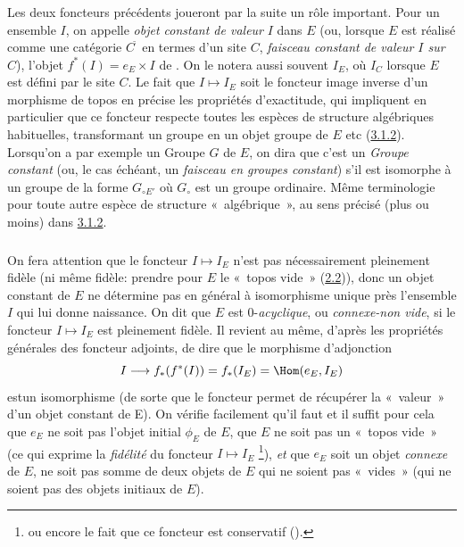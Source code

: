 \documentclass[10pt]{../fichiers-configuration-latex/smfart}
\begin{document}
\setcounter{subsubsection}{3}
\subsubsection{}
Les deux foncteurs précédents joueront par la suite un rôle
important. Pour un ensemble $I$, on appelle \emph{objet constant de
valeur} $I$ dans $E$ (ou, lorsque $E$ est réalisé comme une
catégorie $C^{\widetilde{\phantom{,}}}$ en termes d'un site $C$,
\emph{faisceau constant de valeur $I$ sur $C$}), l'objet
$f^{\ast}(I)=e_E\times I$ de . On le notera aussi
souvent $I_E$, où $I_C$ lorsque $E$ est défini par le site $C$.
Le fait que $I\mapsto I_E$ soit le foncteur image inverse d'un
morphisme de topos en précise les propriétés d'exactitude, qui
impliquent en particulier que ce foncteur respecte toutes les
espèces de structure algébriques habituelles, transformant un
groupe en un objet groupe de $E$ etc (\hyperref[IV.subsubsec3.1.2]{3.1.2}).
Lorsqu'on a par exemple un Groupe $G$ de $E$, on dira que c'est un
\emph{Groupe constant} (ou, le cas échéant, un \emph{faisceau en
groupes constant}) s'il est isomorphe à un groupe de la forme
$G_{\circ E'}$ où $G_{\circ}$ est un groupe ordinaire. Même
terminologie pour toute autre espèce de structure
« algébrique », au sens précisé (plus ou moins) dans
\hyperref[IV.subsubsec3.1.2]{3.1.2}.

\subsubsection{}
On fera attention que le foncteur $I\mapsto I_E$ n'est pas
nécessairement pleinement fidèle (ni même fidèle: prendre
pour $E$ le « topos vide »  (\hyperref[IV.subsec2.2]{2.2})), donc un objet
constant de $E$ ne détermine pas en général à isomorphisme
unique près l'ensemble $I$ qui lui donne naissance. On dit que $E$
est $0$-\emph{acyclique}, ou \emph{connexe-non vide}, si le foncteur
$I\mapsto I_E$ est pleinement fidèle. Il revient au même,
d'après les propriétés générales des foncteur adjoints, de
dire que le morphisme d'adjonction
$$
I\longrightarrow f_{\ast}(f^{\ast}(I))=f_{\ast}(I_E)=\Hom(e_E, I_E)
$$
est\pageoriginale un isomorphisme (de sorte que le foncteur
 permet de récupérer la « valeur »  d'un objet
constant de E). On vérifie facilement qu'il faut et il suffit pour
cela que $e_E$ ne soit pas l'objet initial $\phi_E$ de $E$, \ie que
$E$ ne soit pas un « topos vide » (ce qui exprime la
\emph{fidélité} du foncteur $I\mapsto I_E$ \footnote[1]{ou encore le
fait que ce foncteur est conservatif ().}), \emph{et}
que $e_E$ soit un objet \emph{connexe} de $E$, \ie ne soit pas somme
de deux objets de $E$ qui ne soient pas « vides » (\ie qui ne
soient pas des objets initiaux de $E$).
\end{document}
